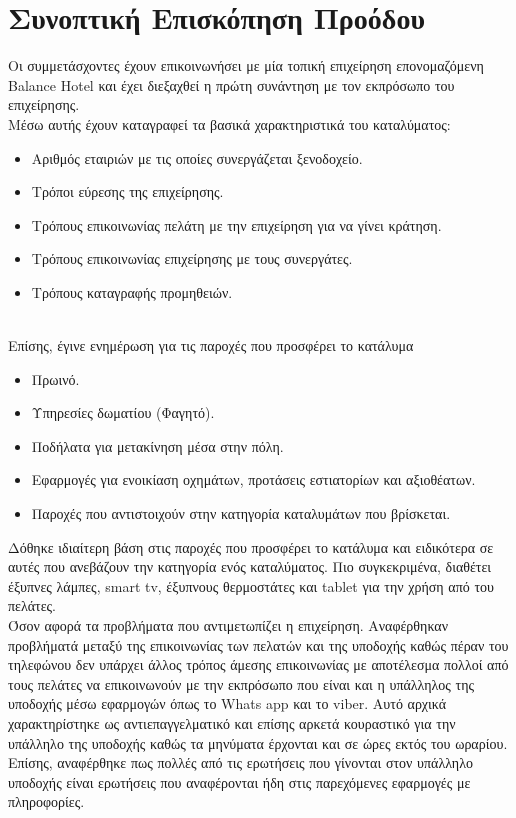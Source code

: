 \section{Συνοπτική Επισκόπηση Προόδου}
Οι συμμετάσχοντες έχουν επικοινωνήσει με μία τοπική επιχείρηση επονομαζόμενη \\Balance Hotel και έχει διεξαχθεί η πρώτη συνάντηση με τον εκπρόσωπο του επιχείρησης. \\

\noindent
Μέσω αυτής έχουν καταγραφεί τα βασικά χαρακτηριστικά του καταλύματος:
	\begin{itemize}
		\item Αριθμός εταιριών με τις οποίες συνεργάζεται ξενοδοχείο.
		\item Τρόποι εύρεσης της επιχείρησης. 
		\item Τρόπους επικοινωνίας πελάτη με την επιχείρηση για να γίνει κράτηση.
		\item Τρόπους επικοινωνίας επιχείρησης με τους συνεργάτες.
		\item Τρόπους καταγραφής προμηθειών.
	\end{itemize}

\hspace{1cm}\\
\noindent
Επίσης, έγινε ενημέρωση για τις παροχές που προσφέρει το κατάλυμα
\begin{itemize}
	\item Πρωινό.
	\item Υπηρεσίες δωματίου (Φαγητό).
 	\item Ποδήλατα για μετακίνηση μέσα στην πόλη.
 	\item Εφαρμογές για ενοικίαση οχημάτων, προτάσεις εστιατορίων και αξιοθέατων.
 	\item Παροχές που αντιστοιχούν στην κατηγορία καταλυμάτων που βρίσκεται.
\end{itemize} 

\noindent
Δόθηκε ιδιαίτερη βάση στις παροχές που προσφέρει το κατάλυμα και ειδικότερα σε αυτές που ανεβάζουν την κατηγορία ενός καταλύματος. Πιο συγκεκριμένα, διαθέτει έξυπνες λάμπες, smart tv, έξυπνους θερμοστάτες και tablet για την χρήση από του πελάτες.\\

\noindent
Όσον αφορά τα προβλήματα που αντιμετωπίζει η επιχείρηση. Αναφέρθηκαν προβλήματά μεταξύ της επικοινωνίας των πελατών και της υποδοχής καθώς πέραν του τηλεφώνου δεν υπάρχει άλλος τρόπος άμεσης επικοινωνίας με αποτέλεσμα πολλοί από τους πελάτες να επικοινωνούν με την εκπρόσωπο που είναι και η υπάλληλος της υποδοχής μέσω εφαρμογών όπως το Whats app και το viber. Αυτό αρχικά χαρακτηρίστηκε ως αντιεπαγγελματικό και επίσης αρκετά κουραστικό για την υπάλληλο της υποδοχής καθώς τα μηνύματα έρχονται και σε ώρες εκτός του ωραρίου. Επίσης, αναφέρθηκε πως πολλές από τις ερωτήσεις που γίνονται στον υπάλληλο υποδοχής είναι ερωτήσεις που αναφέρονται ήδη στις παρεχόμενες εφαρμογές με πληροφορίες.\\


